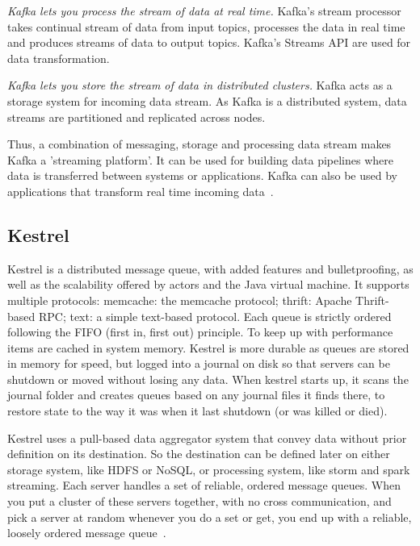      \textit{Kafka lets you process the stream of data at real time.} Kafka's
     stream processor takes continual stream of data from input
     topics, processes the data in real time and produces streams of
     data to output topics. Kafka's Streams API are used for data
     transformation.

     \textit{Kafka lets you store the stream of data in distributed
     clusters.} Kafka acts as a storage system for incoming data
     stream. As Kafka is a distributed system, data streams are
     partitioned and replicated across nodes.

     Thus, a combination of messaging, storage and processing data
     stream makes Kafka a 'streaming platform'. It can be used for
     building data pipelines where data is transferred between systems
     or applications. Kafka can also be used by applications that
     transform real time incoming data~\cite{www-kafka}.

     \pv

\subsection{Kestrel}
     
     Kestrel is a distributed message queue, with added features and
     bulletproofing, as well as the scalability offered by actors and
     the Java virtual machine. It supports multiple protocols:
     memcache: the memcache protocol; thrift: Apache Thrift-based RPC;
     text: a simple text-based protocol. Each queue is strictly
     ordered following the FIFO (first in, first out) principle. To
     keep up with performance items are cached in system
     memory. Kestrel is more durable as queues are stored in memory
     for speed, but logged into a journal on disk so that servers can
     be shutdown or moved without losing any data. When kestrel starts
     up, it scans the journal folder and creates queues based on any
     journal files it finds there, to restore state to the way it was
     when it last shutdown (or was killed or died).

     Kestrel uses a pull-based data aggregator system that convey data
     without prior definition on its destination. So the destination
     can be defined later on either storage system, like HDFS or
     NoSQL, or processing system, like storm and spark streaming. Each
     server handles a set of reliable, ordered message queues. When
     you put a cluster of these servers together, with no cross
     communication, and pick a server at random whenever you do a set
     or get, you end up with a reliable, loosely ordered message
     queue~\cite{git-kestrel}.

